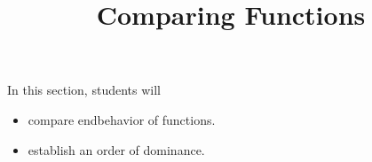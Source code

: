 \documentclass{ximera}
\title{Comparing Functions}
\begin{document}
\begin{abstract}
\end{abstract}
\maketitle

\begin{sectionOutcomes}
In this section, students will 

\begin{itemize}
\item compare endbehavior of functions.
\item establish an order of dominance.
\end{itemize}
\end{sectionOutcomes}
\end{document}

